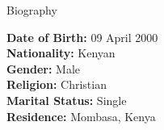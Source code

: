 \documentclass[
	11pt, %
]{resume} %
\begin{document}
\begin{rSection}{Biography}

	\textbf{Date of Birth: } 09 April 2000 \\
	\textbf{Nationality: } Kenyan \\
	\textbf{Gender: } Male \\
	\textbf{Religion: } Christian \\
	\textbf{Marital Status: } Single \\
	\textbf{Residence: } Mombasa, Kenya
	
\end{rSection}
\end{document}
